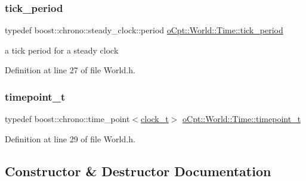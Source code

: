 \hypertarget{classo_cpt_1_1_world_1_1_time_a8191b46c075d8d9ec6db0588797b59a5}{}\label{classo_cpt_1_1_world_1_1_time_a8191b46c075d8d9ec6db0588797b59a5} 
\subsubsection{\texorpdfstring{tick\+\_\+period}{tick\_period}}
{\footnotesize\ttfamily typedef boost\+::chrono\+::steady\+\_\+clock\+::period \hyperlink{classo_cpt_1_1_world_1_1_time_a8191b46c075d8d9ec6db0588797b59a5}{o\+Cpt\+::\+World\+::\+Time\+::tick\+\_\+period}}



a tick period for a steady clock 



Definition at line 27 of file World.\+h.

\hypertarget{classo_cpt_1_1_world_1_1_time_a6a6e782c3c90622c1c7070b0a223ec4c}{}\label{classo_cpt_1_1_world_1_1_time_a6a6e782c3c90622c1c7070b0a223ec4c} 
\subsubsection{\texorpdfstring{timepoint\+\_\+t}{timepoint\_t}}
{\footnotesize\ttfamily typedef boost\+::chrono\+::time\+\_\+point$<$\hyperlink{classo_cpt_1_1_world_1_1_time_ac41de01610f32d0ace4844ed3bf454f7}{clock\+\_\+t}$>$ \hyperlink{classo_cpt_1_1_world_1_1_time_a6a6e782c3c90622c1c7070b0a223ec4c}{o\+Cpt\+::\+World\+::\+Time\+::timepoint\+\_\+t}}



Definition at line 29 of file World.\+h.



\subsection{Constructor \& Destructor Documentation}
\hypertarget{classo_cpt_1_1_world_1_1_time_a831b0a1d8bd9ebe4ebe0111bd4516eb5}{}\label{classo_cpt_1_1_world_1_1_time_a831b0a1d8bd9ebe4ebe0111bd4516eb5} 
